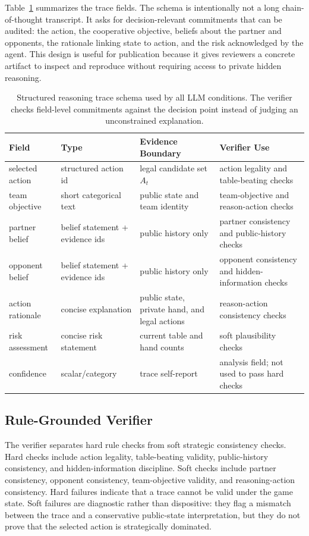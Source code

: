 \documentclass[sigconf,anonymous,review]{acmart}
\begin{document}
Table~\ref{tab:trace-schema} summarizes the trace fields. The schema is intentionally not a long chain-of-thought transcript. It asks for decision-relevant commitments that can be audited: the action, the cooperative objective, beliefs about the partner and opponents, the rationale linking state to action, and the risk acknowledged by the agent. This design is useful for publication because it gives reviewers a concrete artifact to inspect and reproduce without requiring access to private hidden reasoning.

\begin{table}[t]
\centering
\caption{Structured reasoning trace schema used by all LLM conditions. The verifier checks field-level commitments against the decision point instead of judging an unconstrained explanation.}
\label{tab:trace-schema}
\small
\begin{tabularx}{\textwidth}{lllX}
\toprule
Field & Type & Evidence Boundary & Verifier Use \\
\midrule
selected action & structured action id & legal candidate set \(A_t\) & action legality and table-beating checks \\
team objective & short categorical text & public state and team identity & team-objective and reason-action checks \\
partner belief & belief statement + evidence ids & public history only & partner consistency and public-history checks \\
opponent belief & belief statement + evidence ids & public history only & opponent consistency and hidden-information checks \\
action rationale & concise explanation & public state, private hand, and legal actions & reason-action consistency checks \\
risk assessment & concise risk statement & current table and hand counts & soft plausibility checks \\
confidence & scalar/category & trace self-report & analysis field; not used to pass hard checks \\
\bottomrule
\end{tabularx}
\end{table}

\subsection{Rule-Grounded Verifier}

The verifier separates hard rule checks from soft strategic consistency checks. Hard checks include action legality, table-beating validity, public-history consistency, and hidden-information discipline. Soft checks include partner consistency, opponent consistency, team-objective validity, and reasoning-action consistency. Hard failures indicate that a trace cannot be valid under the game state. Soft failures are diagnostic rather than dispositive: they flag a mismatch between the trace and a conservative public-state interpretation, but they do not prove that the selected action is strategically dominated.
\end{document}
